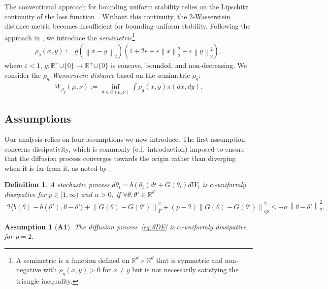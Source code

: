 \documentclass{article}
\newcommand{\norm}[1]{\left\lVert#1\right\rVert} %
\newtheorem{definition}{Definition}
\newtheorem{assumption}{Assumption}
\begin{document}
The conventional approach for bounding uniform stability relies on the Lipschitz continuity of the loss function~\citep{Raginsky, Farghly}. Without this continuity, the 2-Wasserstein distance metric becomes insufficient for bounding uniform stability. Following the approach in \citet{Farghly}, we introduce the \emph{semimetric}\footnote{A semimetric is a function defined on $\mathbb{R}^d \times \mathbb{R}^d$ that is symmetric and non-negative with $\rho_g(x, y) > 0$ for $x \neq y$ but is not necessarily satisfying the triangle inequality.}
\begin{align}\label{eq:semimetric}
    \!\rho_g (x,y) := g(\norm{x-y}_2) (1+2\varepsilon+\varepsilon\norm{x}_2^2 +\varepsilon\norm{y}_2^2),\!\!
\end{align}
where $\varepsilon <1$, $g: \mathbb{R}^+ { \cup \{0\}} \rightarrow \mathbb{R}^+ {\cup \{0\}}$ is concave, bounded, and non-decreasing. We consider the \textit{$\rho_g$-Wasserstein distance} based on the semimetric $\rho_g$:
\begin{align}\label{eq:Wasserstein}
    W_{\rho_g} (\mu, \nu) := \inf_{\pi \in \mathcal{C}(\mu, \nu)} \int \rho_g(x,y) \pi(dx, dy).
\end{align}

\subsection{Assumptions}
Our analysis relies on four assumptions we now introduce. The first assumption concerns dissipativity, which is commonly (c.f.\ introduction) imposed to ensure that the diffusion process converges towards the origin rather than diverging when it is far from it, as noted by \citet{Erdogdu}. 

\begin{definition}
    A stochastic process $d\theta_t = b (\theta_t) dt + G(\theta_t) dW_t$ is $\alpha$-uniformly dissipative for $p \in [1, \infty)$ and $\alpha > 0$, if $\forall \theta, \theta' \in \mathbb{R}^d$
    \begin{align}\label{eq:unifdiss}
        2 \langle b(\theta) - b(\theta'), \theta - \theta' \rangle + \norm{ G(\theta) - G(\theta')}_F^2 + (p-2) \norm{G(\theta) - G(\theta')}_{op}^2 \leq -\alpha \norm{\theta - \theta'}_2^2.
    \end{align}
\end{definition}

\begin{assumption}[\textbf{A1}]\label{ass:unifdiss}
    The diffusion process~\eqref{eq:SDE} is $\alpha$-uniformly dissipative for $p=2$.
\end{assumption}
\end{document}
